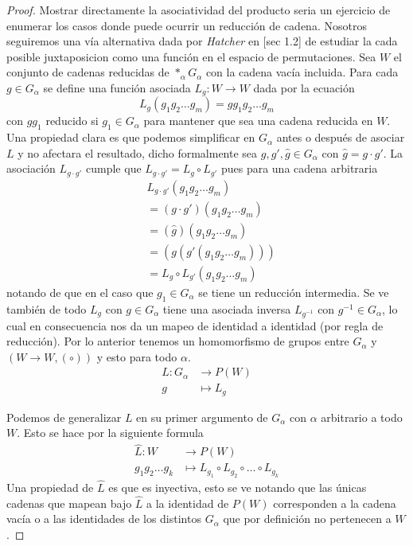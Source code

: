 \begin{proof}
  Mostrar directamente la asociatividad del producto seria un ejercicio
  de enumerar los casos donde puede ocurrir un reducción de cadena.
  Nosotros seguiremos una vía alternativa dada por \emph{Hatcher} en
  \cite{Hatcher}[sec 1.2] de estudiar la cada posible juxtaposicion como
  una función en el espacio de permutaciones. Sea \(W\) el conjunto de
  cadenas reducidas de \(*_\alpha G_\alpha\) con la cadena vacía
  incluida. Para cada \(g \in G_\alpha\) se define una función asociada
  \(L _g : W \to W\) dada por la ecuación
  \[ L_g \left( g_1 g_2 \dots g_m \right) = g g_1 g_2 \dots g_m \]
  con \(g g_1\) reducido si \(g_1 \in G_\alpha \) para mantener que sea
  una cadena reducida en \(W\). Una propiedad clara es que podemos
  simplificar en \(G_\alpha\) antes o después de asociar \(L\) y no
  afectara el resultado, dicho formalmente sea \(g, g', \hat g \in
  G_\alpha\) con \(\hat g = g \cdot g'\). La asociación \(L_{g \cdot
  g'}\) cumple que \(L _{g \cdot g'} = L_{g} \circ L_{g'}\) pues para una
  cadena arbitraria
  \begin{align*}
    &L_{g \cdot g'} \left( g_1 g_2 \dots g_m \right) \\
    &= (g \cdot g') (g_1 g_2 \dots g_m) \\
    &= (\hat g) (g_1 g_2 \dots g_m) \\
    &= (g (g' (g_1 g_2 \dots g_m))) \\
    &= L_g \circ L_{g'} \left( g_1 g_2 \dots g_m \right)
  \end{align*}
  notando de que en el caso que \(g_1 \in G_\alpha\) se tiene un
  reducción intermedia. Se ve también de todo \(L_g\) con \(g \in
  G_\alpha\) tiene una asociada inversa \(L_{g^{-1}}\) con \(g^{-1} \in
  G_\alpha\), lo cual en consecuencia nos da un mapeo de identidad a
  identidad (por regla de reducción). Por lo anterior tenemos un
  homomorfismo de grupos entre \(G_\alpha\) y \((W \to W, (\circ))\) y
  esto para todo \(\alpha\).
  \begin{align*}
    L: G_\alpha &\longrightarrow P(W) \\
    g &\longmapsto L_g
  \end{align*}

  Podemos de generalizar \(L\) en su primer
  argumento de \(G_\alpha\) con \(\alpha\) arbitrario a todo \(W\). Esto
  se hace por la siguiente formula
  \begin{align}
    \hat L : W &\longrightarrow P(W) \nonumber \\
    g_1 g_2 \dots g_k &\longmapsto L_{g_1} \circ L_{g_2} \circ \dots
    \circ L_{g_k} \label{def:hatL}
  \end{align}
  Una propiedad de \(\hat L\) es que es inyectiva, esto se ve notando
  que las únicas cadenas que mapean bajo \(\hat L\) a la identidad de
  \(P (W)\) corresponden a la cadena vacía o a las identidades de los
  distintos \(G_\alpha\) que por definición no pertenecen a \(W\).


\end{proof}
